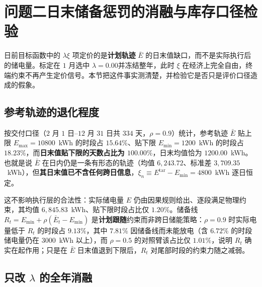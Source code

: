 
\section{问题二日末储备惩罚的消融与库存口径检验}
\label{app:p2-lambda}

日前目标函数中的 $\lambda\xi$ 项定价的是\textbf{计划轨迹} $\bar E$ 的日末值缺口，而不是实际执行后的储电量。标定在 $1$ 月选中 $\lambda=0.00$并冻结整年，此时 $\xi$ 在经济上完全自由，终端约束不再产生定价信号。本节把这件事实测清楚，并检验它是否只是评价口径造成的假象。

\subsection{参考轨迹的退化程度}

按交付口径（$2$ 月 $1$ 日--$12$ 月 $31$ 日共 $334$ 天，$\rho=0.9$）统计，参考轨迹 $\bar E$ 贴上限 $E_{\max}=10800$~kWh 的时段占 $15.64\%$、贴下限 $E_{\min}=1200$~kWh 的时段占 $18.23\%$，而\textbf{日末值贴下限的天数占比为 $100.00\%$}，日末均值恰为 $1200.00$~kWh。也就是说 $\bar E$ 在日内仍是一条有形态的轨迹（均值 $6,243.72$、标准差 $3,709.35$~kWh），但\textbf{其日末值已不含任何跨日信息}，$\xi_n\equiv E^{\mathrm{tar}}-E_{\min}=4800$~kWh 逐日恒定。

这不影响执行层的合法性：实际储电量 $E$ 仍由因果规则给出、逐段满足物理约束，其均值 $6,845.83$~kWh、贴下限时段占比仅 $1.20\%$。储备线 $R_t=E_{\min}+\rho(\bar E_t-E_{\min})$ 是\textbf{计划跟随}约束而非跨日储能策略：$\rho=0.9$ 时实际电量低于 $R_t$ 的时段占 $9.13\%$，其中 $7.81\%$ 因储备线而未能放电（含 $6.72\%$ 的时段储电量仍在 $3000$~kWh 以上），而 $\rho=0.5$ 的对照臂该占比仅 $1.01\%$，说明 $R_t$ 确实在起作用；只是在 $\bar E$ 日末值退到下限后，$R_t$ 对尾部时段的约束力随之减弱。

\subsection{只改 $\lambda$ 的全年消融}

